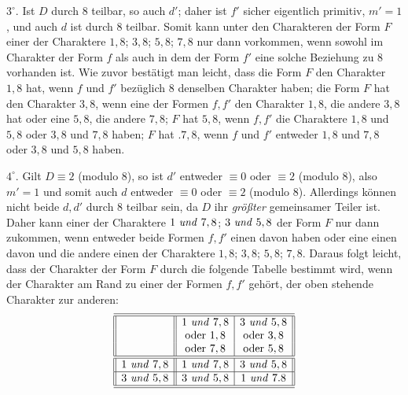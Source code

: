 $3^{\circ}$. Ist $D$ durch $8$ teilbar, so auch $d'$; daher ist $f'$ sicher eigentlich primitiv, $m'=1$, und auch $d$ ist durch $8$ teilbar. Somit kann unter den Charakteren der Form $F$ einer der Charaktere $1,8$; $3,8$; $5,8$; $7,8$ nur dann vorkommen, wenn sowohl im Charakter der Form $f$ als auch in dem der Form $f'$ eine solche Beziehung zu $8$ vorhanden ist. Wie zuvor bestätigt man leicht, dass die Form $F$ den Charakter $1,8$ hat, wenn $f$ und $f'$ bezüglich $8$ denselben Charakter haben; die Form $F$ hat den Charakter $3,8$, wenn eine der Formen $f,f'$ den Charakter $1,8$, die andere $3,8$ hat oder eine $5,8$, die andere $7,8$; $F$ hat $5,8$, wenn $f,f'$ die Charaktere $1,8$ und $5,8$ oder $3,8$ und $7,8$ haben; $F$ hat $.7,8$, wenn $f$ und $f'$ entweder $1,8$ und $7,8$ oder $3,8$ und $5,8$ haben.

$4^{\circ}$. Gilt $D\equiv2$ (modulo $8$), so ist $d'$ entweder $\equiv0$ oder $\equiv2$ (modulo $8$), also $m'=1$ und somit auch $d$ entweder $\equiv0$ oder $\equiv2$ (modulo $8$). Allerdings können nicht beide $d,d'$ durch $8$ teilbar sein, da $D$ ihr \textit{größter} gemeinsamer Teiler ist. Daher kann einer der Charaktere $1\text{ \textit{und} }7,8$; $3\text{ \textit{und} }5,8$ der Form $F$ nur dann zukommen, wenn entweder beide Formen $f,f'$ einen davon haben oder eine einen davon und die andere einen der Charaktere $1,8$; $3,8$; $5,8$; $7,8$. Daraus folgt leicht, dass der Charakter der Form $F$ durch die folgende Tabelle bestimmt wird, wenn der Charakter am Rand zu einer der Formen $f,f'$ gehört, der oben stehende Charakter zur anderen:
\[
\begin{array}{||c||c|c||}
\hline\hline
 & 1\text{ \textit{und} }7,8 & 3\text{ \textit{und} }5,8 \\
 & \text{oder }1,8 & \text{oder }3,8 \\
 & \text{oder }7,8 & \text{oder }5,8 \\
\hline\hline
1\text{ \textit{und} }7,8 & 1\text{ \textit{und} }7,8 & 3\text{ \textit{und} }5,8 \\
\hline
3\text{ \textit{und} }5,8 & 3\text{ \textit{und} }5,8 & 1\text{ \textit{und} }7.8 \\
\hline\hline
\end{array}
\]

